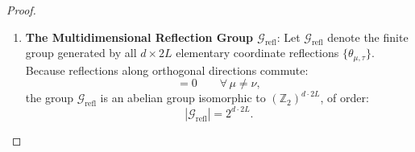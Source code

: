 \begin{proof}
\begin{enumerate}[label=\textbf{Step \arabic*:}, leftmargin=*]
    Applying the Cauchy--Schwarz inequality to the pair $\Theta_{\mu, \tau}(A^-) \in \mathcal{A}^+$ and $A^+ \in \mathcal{A}^+$:
    \begin{equation}
    \left| \left( \Theta_{\mu, \tau}(A^-), \; A^+ \right)_{\mathrm{RP}} \right|^2 \le \left( \Theta_{\mu, \tau}(A^-), \; \Theta_{\mu, \tau}(A^-) \right)_{\mathrm{RP}} \cdot \left( A^+, \; A^+ \right)_{\mathrm{RP}}.
    \end{equation}
    Unfolding the definition of the inner product and using the involution property $\Theta_{\mu, \tau}^2 = \mathrm{id}$:
    \begin{equation}
    \left( \Theta_{\mu, \tau}(A^-), \; A^+ \right)_{\mathrm{RP}} = \langle \Theta_{\mu, \tau}\left(\Theta_{\mu, \tau}(A^-)\right) A^+ \rangle = \langle A^- A^+ \rangle = \langle A \rangle.
    \end{equation}
    The first norm on the right-hand side is:
    \begin{equation}
    \left( \Theta_{\mu, \tau}(A^-), \; \Theta_{\mu, \tau}(A^-) \right)_{\mathrm{RP}} = \langle \Theta_{\mu, \tau}\left(\Theta_{\mu, \tau}(A^-)\right) \Theta_{\mu, \tau}(A^-) \rangle = \langle A^- \Theta_{\mu, \tau}(A^-) \rangle.
    \end{equation}
    The second norm is:
    \begin{equation}
    \left( A^+, \; A^+ \right)_{\mathrm{RP}} = \langle \Theta_{\mu, \tau}(A^+) A^+ \rangle.
    \end{equation}
    Therefore:
    \begin{equation}
    \label{eq:one_refl_step}
    |\langle A \rangle| = |\langle A^- A^+ \rangle| \le \langle A^- \Theta_{\mu, \tau}(A^-) \rangle^{1/2} \, \langle \Theta_{\mu, \tau}(A^+) A^+ \rangle^{1/2}.
    \end{equation}
    In the factor $\langle \Theta_{\mu, \tau}(A^+) A^+ \rangle$, the observable in $\Lambda^-$ has been completely eliminated and replaced by the mirror image of the observable in $\Lambda^+$. The state $\Theta_{\mu, \tau}(A^+) A^+$ is now strictly symmetric under reflection across $\Pi_{\mu, \tau}$.

    \item \textbf{The Multidimensional Reflection Group $\mathcal{G}_{\mathrm{refl}}$}:
    Let $\mathcal{G}_{\mathrm{refl}}$ denote the finite group generated by all $d \times 2L$ elementary coordinate reflections $\{\theta_{\mu, \tau}\}$. Because reflections along orthogonal directions commute:
    \begin{equation}
    [\theta_{\mu, \tau}, \; \theta_{\nu, \tau'}] = 0 \qquad \forall \, \mu \neq \nu,
    \end{equation}
    the group $\mathcal{G}_{\mathrm{refl}}$ is an abelian group isomorphic to $(\mathbb{Z}_2)^{d \cdot 2L}$, of order:
    \begin{equation}
    |\mathcal{G}_{\mathrm{refl}}| = 2^{d \cdot 2L}.
    \end{equation}


\end{enumerate}
\end{proof}
